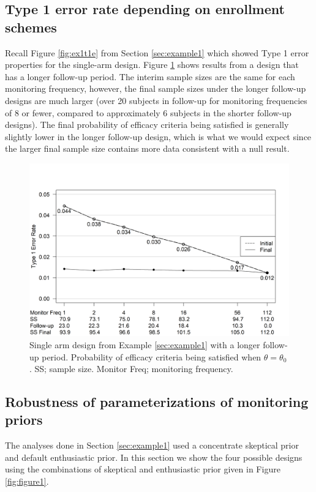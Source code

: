 \documentclass[12pt]{article}
\begin{document}
\subsection{Type 1 error rate depending on enrollment schemes}
Recall Figure \ref{fig:ex1t1e} from Section \ref{sec:example1} which showed Type 1 error properties for the single-arm design. Figure \ref{fig:ex1t1e_longer} shows results from a design that has a longer follow-up period. The interim sample sizes are the same for each monitoring frequency, however, the final sample sizes under the longer follow-up designs are much larger (over 20 subjects in follow-up for monitoring frequencies of 8 or fewer, compared to approximately 6 subjects in the shorter follow-up designs). The final probability of efficacy criteria being satisfied is generally slightly lower in the longer follow-up design, which is what we would expect since the larger final sample size contains more data consistent with a null result.
\begin{figure}\begin{center}

   \includegraphics[width=6in]{./FIGURES/figureS1.png}
    \caption{Single arm design from Example \ref{sec:example1} with a longer follow-up period. Probability of efficacy criteria being satisfied when $\theta=\theta_0$. SS; sample size. Monitor Freq; monitoring frequency.}
	\label{fig:ex1t1e_longer}

\end{center}\end{figure}


\subsection{Robustness of parameterizations of monitoring priors}\label{sec:priorRobustness}
The analyses done in Section \ref{sec:example1} used a concentrate skeptical prior and default enthusiastic prior. In this section we show the four possible designs using the combinations of skeptical and enthusiastic prior given in Figure \ref{fig:figure1}.
\end{document}
